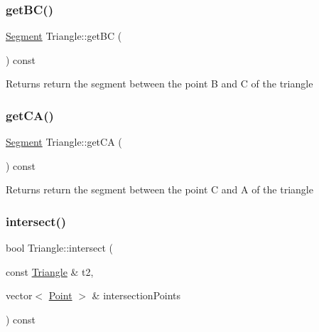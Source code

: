 \subsubsection{\texorpdfstring{get\+B\+C()}{getBC()}}
{\footnotesize\ttfamily \hyperlink{class_segment}{Segment} Triangle\+::get\+BC (\begin{DoxyParamCaption}{ }\end{DoxyParamCaption}) const\hspace{0.3cm}{\ttfamily [inline]}}

\begin{DoxyReturn}{Returns}
return the segment between the point B and C of the triangle 
\end{DoxyReturn}
\hypertarget{class_triangle_a17394838467805e991e28444b7d805b5}{}\label{class_triangle_a17394838467805e991e28444b7d805b5} 
\subsubsection{\texorpdfstring{get\+C\+A()}{getCA()}}
{\footnotesize\ttfamily \hyperlink{class_segment}{Segment} Triangle\+::get\+CA (\begin{DoxyParamCaption}{ }\end{DoxyParamCaption}) const\hspace{0.3cm}{\ttfamily [inline]}}

\begin{DoxyReturn}{Returns}
return the segment between the point C and A of the triangle 
\end{DoxyReturn}
\hypertarget{class_triangle_a8f1c191200d6f71717e63fe08e272c57}{}\label{class_triangle_a8f1c191200d6f71717e63fe08e272c57} 
\subsubsection{\texorpdfstring{intersect()}{intersect()}}
{\footnotesize\ttfamily bool Triangle\+::intersect (\begin{DoxyParamCaption}\item[{const \hyperlink{class_triangle}{Triangle} \&}]{t2,  }\item[{vector$<$ \hyperlink{class_point}{Point} $>$ \&}]{intersection\+Points }\end{DoxyParamCaption}) const}



